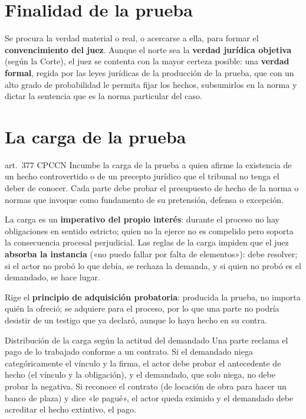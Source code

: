 \documentclass[12pt,oneside]{book}
\begin{document}
\section{Finalidad de la prueba}

Se procura la verdad material o real, o acercarse a ella, para formar el \textbf{convencimiento del juez}. Aunque el norte sea la \textbf{verdad jurídica objetiva} (según la Corte), el juez se contenta con la mayor certeza posible: una \textbf{verdad formal}, regida por las leyes jurídicas de la producción de la prueba, que con un alto grado de probabilidad le permita fijar los hechos, subsumirlos en la norma y dictar la sentencia que es la norma particular del caso.

\section{La carga de la prueba}

\begin{regla}{art.~377 CPCCN}
Incumbe la carga de la prueba a quien afirme la existencia de un hecho controvertido o de un precepto jurídico que el tribunal no tenga el deber de conocer. Cada parte debe probar el presupuesto de hecho de la norma o normas que invoque como fundamento de su pretensión, defensa o excepción.
\end{regla}

La carga es un \textbf{imperativo del propio interés}: durante el proceso no hay obligaciones en sentido estricto; quien no la ejerce no es compelido pero soporta la consecuencia procesal perjudicial. Las reglas de la carga impiden que el juez \textbf{absorba la instancia} («no puedo fallar por falta de elementos»): debe resolver; si el actor no probó lo que debía, se rechaza la demanda, y si quien no probó es el demandado, se hace lugar.

Rige el \textbf{principio de adquisición probatoria}: producida la prueba, no importa quién la ofreció; se adquiere para el proceso, por lo que una parte no podría desistir de un testigo que ya declaró, aunque lo haya hecho en su contra.

\begin{ejemplo}{Distribución de la carga según la actitud del demandado}
Una parte reclama el pago de lo trabajado conforme a un contrato. Si el demandado niega categóricamente el vínculo y la firma, el actor debe probar el antecedente de hecho (el vínculo y la obligación), y el demandado, que solo niega, no debe probar la negativa. Si reconoce el contrato (de locación de obra para hacer un banco de plaza) y dice «le pagué», el actor queda eximido y el demandado debe acreditar el hecho extintivo, el pago.
\end{ejemplo}
\end{document}
